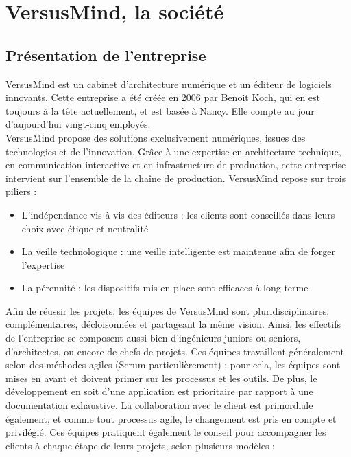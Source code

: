 \documentclass[12pt]{report}
\begin{document}
\chapter{VersusMind, la société}

  \section{Présentation de l'entreprise}
  
VersusMind est un cabinet d’architecture numérique et un éditeur de logiciels innovants. Cette entreprise a été créée en 2006 par Benoit Koch, qui en est toujours à la tête actuellement, et est basée à Nancy. Elle compte au jour d’aujourd’hui vingt-cinq employés.\\

VersusMind propose des solutions exclusivement numériques, issues des technologies et de l’innovation. Grâce à une expertise en architecture technique, en communication interactive et en infrastructure de production, cette entreprise intervient sur l’ensemble de la chaîne de production. VersusMind repose sur trois piliers : \\

\begin{itemize}
\item L’indépendance vis-à-vis des éditeurs : les clients sont conseillés dans leurs choix avec étique et neutralité
\item La veille technologique : une veille intelligente est maintenue afin de forger l’expertise
\item La pérennité : les dispositifs mis en place sont efficaces à long terme\\
\end{itemize}

Afin de réussir les projets, les équipes de VersusMind sont pluridisciplinaires, complémentaires, décloisonnées et partageant la même vision. Ainsi, les effectifs de l’entreprise se composent aussi bien d’ingénieurs juniors ou seniors, d’architectes, ou encore de chefs de projets. Ces équipes travaillent généralement selon des méthodes agiles (Scrum particulièrement) ; pour cela, les équipes sont mises en avant et doivent primer sur les processus et les outils. De plus, le développement en soit d’une application est prioritaire par rapport à une documentation exhaustive. La collaboration avec le client est primordiale également, et comme tout processus agile, le changement est pris en compte et privilégié. Ces équipes pratiquent également le conseil pour accompagner les clients à chaque étape de leurs projets, selon plusieurs modèles : \\
\end{document}
